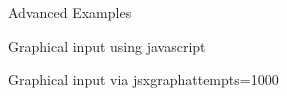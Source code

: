 \begin{edXchapter}{Advanced Examples}
\begin{edXsection}{Graphical input using javascript}
\begin{edXvertical}
\begin{edXproblem}{Graphical input via jsxgraph}{attempts=1000}
%

\end{edXproblem}


\end{edXvertical}


\end{edXsection}


\end{edXchapter}
